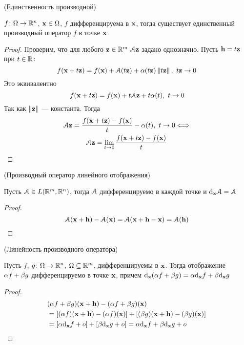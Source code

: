 \begin{theorem}(Единственность производной)

    $f \colon \O \to \Rn$, $\x \in \O$, $f$ дифференцируема в $\x$, тогда
    существует единственный производный оператор $f$ в точке $\x$.
\end{theorem}
\begin{proof}
    Проверим, что для любого $\z \in \Rm~ \cA \z$ задано однозначно.
     Пусть $\h = t\z$ при $t \in \R$:
\[
    f(\x + t \z) = f(\x) + \cA(t \z) + \a(t\z) \norm{t\z},~ t\z \to 0
\]
    Это эквивалентно
\[
    f(\x + t \z) = f(\x) + t\cA \z + t\a(t),~ t \to 0
\]
    Так как $\norm{\z}$ --- константа. Тогда
\begin{gather*}
    \cA\z = \frac{f(\x + t \z) - f(\x)}{t} - \a(t),~ t \to 0 \Llra \\
    \cA\z = \lim_{t \to 0}{\frac{f(\x + t \z) - f(\x)}{t}}
\end{gather*}
\end{proof}

\begin{proposition}(Производный оператор линейного отображения)

    Пусть $\cA \in L(\Rm, \Rn)$, тогда $\cA$ дифференцируемо в каждой точке и
    $\der{\cA}{\x} = \cA$
\end{proposition}
\begin{proof}
\[
    \cA(\x + \h) - \cA(\x) = \cA(\x + \h - \x) = \cA(\h)
\]
\end{proof}

\begin{proposition}(Линейность производного оператора)

    Пусть $f$, $g \colon \O \to \Rn$, $\O \subseteq \Rm$, дифференцируемы в
    $\x$. Тогда отображение $\a f + \b g$ дифференцируемо в точке $\x$, причем
    $\der{(\a f + \b g)}{\x} = \a \der{f}{\x} + \b \der{g}{\x}$
\end{proposition}
\begin{proof}
\begin{align*}
    &(\a f + \b g)(\x + \h) - (\a f + \b g)(\x) \\
    &= [(\a f)(\x + \h) - (\a f)(\x)] + [(\b g)(\x + \h) - (\b g)(\x)] \\
    &= [\a\der{f}{\x} + o] + [\b\der{g}{\x} + o] 
	= \a\der{f}{\x} + \b\der{g}{\x} + o
\end{align*}
\end{proof}

